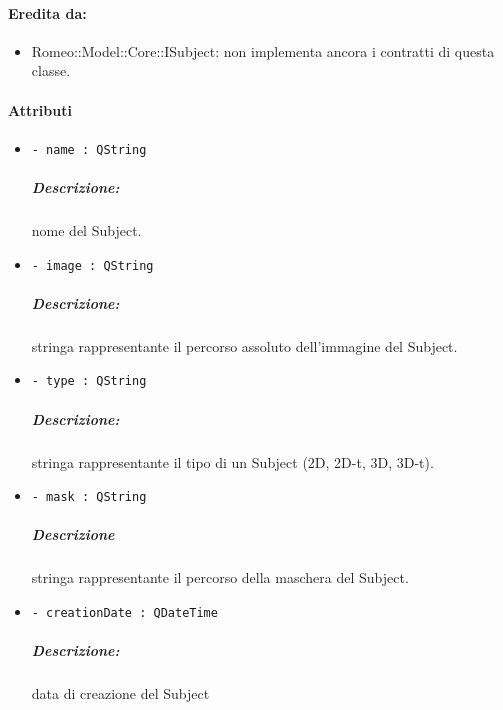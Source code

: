 \paragraph{Eredita da:}
\begin{itemize}
	\item Romeo::Model::Core::ISubject: non implementa ancora i contratti di questa classe.
\end{itemize}

\paragraph{Attributi \\}
	\begin{itemize}
			\item \color{teal} \verb!- name : QString!
					\color{black}
					\subparagraph{Descrizione:} nome del Subject\g{}.
					\item \color{teal} \verb!- image : QString!
					\color{black}
					\subparagraph{Descrizione:} stringa rappresentante il percorso assoluto dell'immagine del Subject\g{}.
					\item \color{teal} \verb!- type : QString!
					\color{black}
					\subparagraph{Descrizione:} stringa rappresentante il tipo di un Subject\g{} (2D, 2D-t, 3D, 3D-t).
					\item \color{teal} \verb!- mask : QString!
					\color{black}
					\subparagraph{Descrizione} stringa rappresentante il percorso della maschera del Subject\g{}.
					\item \color{teal} \verb!- creationDate : QDateTime!
					\color{black}
					\subparagraph{Descrizione:} data di creazione del Subject\g{}
	\end{itemize}
	
